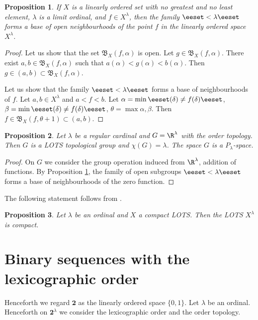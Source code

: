 \documentclass[preprint]{elsarticle}
\def\be{\beta}
\def\al{\alpha}
\def\la{\lambda}
\def\de{\delta}
\def\sset#1{\{#1\}}
\def\set#1{\bbset#1\eeset}
\def\bbset#1:#2\eeset{\{#1\,:\,#2\}}
\def\te{\theta}
\newtheorem{proposition}{Proposition}[section]
\newtheorem{theorem}{Theorem}[section]
\theoremstyle{definition}
\theoremstyle{remark}
\def\lex#1#2{\mathfrak{L}(#2^{#1})}
\def\lex#1#2{#2^{#1}}
\def\blex#1#2#3#4{\mathfrak{B}(#1,#2;#4^{#3})}
\def\blex#1#2#3#4{\mathfrak{B}_{#4^{#3}}(#1,#2)}
\def\blex#1#2#3#4{\mathfrak{B}_{#4}(#1,#2)}
\def\B{2}
\def\B{\mathsf{2}}
\def\B{\mathbf{2}}
\def\lexab{\lex\la\B}
\begin{document}
\begin{proposition}\label{p:2}
If $X$ is a linearly ordered set with no greatest and no least element, $\la$ is a limit ordinal, and $f\in\lex \la X$, then the family $\set{\blex f\al \la X: \al<\la}$ forms a base of open neighbourhoods of the point $f$ in the linearly ordered space $\lex \la X$.
\end{proposition}
\begin{proof}
Let us show that the set $\blex f\al \la X$ is open. Let $g\in \blex f\al \la X$. There exist $a,b\in \blex f\al \la X$ such that $a(\al)<g(\al)<b(\al)$. Then $g\in (a,b)\subset \blex f\al \la X$.

Let us show that the family $\set{\blex f\al \la X: \al<\la}$ forms a base of neighbourhoods of $f$. Let $a,b\in \lex \la X$ and $a< f <b$. Let $\al=\min\set{\de<\la: a(\de)\neq f(\de)}$, $\be=\min\set{\de<\la: b(\de)\neq f(\de)}$, $\te=\max \al,\be$. Then $f\in \blex f{\te+1} \la X\subset (a,b)$.
\end{proof}

\begin{proposition}\label{p:h:tg1}
Let $\la$ be a regular cardinal and $G=\lex \la \R$ with the order topology.
Then $G$ is a LOTS topological group and $\chi(G)=\la$.
The space $G$ is a $P_\la$-space.
\end{proposition}
\begin{proof}
On $G$ we consider the group operation induced from $\R^\la$, addition of functions. By Proposition \ref{p:2}, the family of open subgroups $\set{\blex 0\al \la \R: \al<\la}$ forms a base of neighbourhoods of the zero function.
\end{proof}

The following statement follows from \cite[Proposition 1.3(b)]{AkinHrbacek2002}.

\begin{proposition}\label{p:h:1}
Let $\la$ be an ordinal and $X$ a compact LOTS.
Then the LOTS $\lex \la X$ is compact.
\end{proposition}



\section{Binary sequences with the lexicographic order} \label{sec:blex}

Henceforth we regard $\B$ as the linearly ordered space $\sset{0,1}$.
Let $\la$ be an ordinal.
Henceforth on $\lexab$ we consider the lexicographic order and the order topology.
\end{document}

